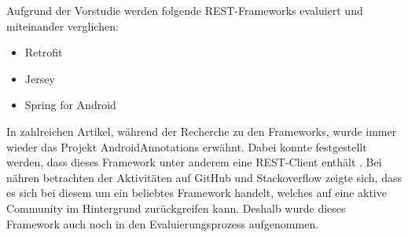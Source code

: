 Aufgrund der Vorstudie werden folgende REST-Frameworks evaluiert und miteinander verglichen:

\begin{itemize}
	\item Retrofit 
	\item Jersey
	\item Spring for Android
\end{itemize}

In zahlreichen Artikel, während der Recherche zu den Frameworks, wurde immer wieder das Projekt AndroidAnnotations erwähnt. Dabei konnte festgestellt werden, dass dieses Framework unter anderem eine REST-Client enthält \cite{diwakar:androidAnnotations}. Bei nähren betrachten der Aktivitäten auf GitHub und Stackoverflow zeigte sich, dass es sich bei diesem um ein beliebtes Framework handelt, welches auf eine aktive Community im Hintergrund zurückgreifen kann. Deshalb wurde dieses Framework auch noch in den Evaluierungsprozess aufgenommen.